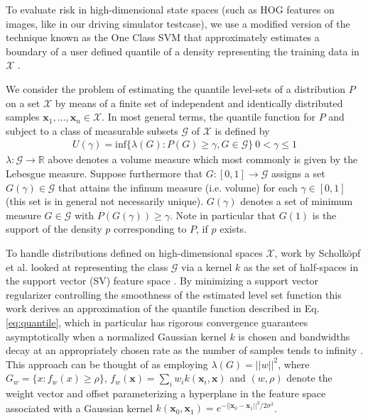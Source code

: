 \documentclass[10pt, conference]{ieeeconf}      %
\newcommand{\bx}{\mathbf{x}}
\newcommand{\fpnote}[1]{\ifthenelse{\boolean{include-notes}}%
 {\textcolor{blue}{\textbf{FP: #1}}}{}}
\begin{document}
To evaluate risk in high-dimensional state spaces (such as HOG features on images, like in our driving simulator testcase), we use
a modified version of the technique known as the One Class SVM that  approximately estimates a boundary of a user defined quantile of
a density representing the training data in $\mathcal{X}$ \cite{scholkopf2001estimating}.


We consider the problem of estimating the quantile level-sets of a distribution $P$ on a set $\mathcal{X}$ by means of a finite set of
independent and identically distributed samples $\mathbf{x}_1,...,\mathbf{x}_n\in \mathcal{X}$.
In most general terms, the quantile function for $P$ and subject to a class of measurable subsets $\mathcal{G}$ of $\mathcal{X}$ is
defined by
\begin{align}\label{eq:quantile}
U(\gamma) = \mbox{inf} \lbrace \lambda(G):P(G) \geq \gamma, G \in \mathcal{G} \rbrace \: 0<\gamma \leq 1
\end{align} 
$\lambda:\mathcal{G}\to \mathbb{R}$ above denotes a volume measure which most commonly is given by the Lebesgue measure.
Suppose furthermore that $G:[0,1]\to \mathcal{G}$ assigns a set $G(\gamma) \in \mathcal{G}$ that attains the infinum
measure (i.e. volume) for each $\gamma\in [0,1]$ (this set is in general not necessarily unique). 
$G(\gamma)$ denotes a set of minimum measure $G \in \mathcal{G}$ with $P(G(\gamma))\ge \gamma$. Note in particular that $G(1)$ is the support of the density $p$ corresponding to $P$, if $p$ exists. 

To handle distributions defined on high-dimensional spaces $\mathcal{X}$, work by Scholk{\"o}pf et al. looked at representing the class $\mathcal{G}$ via a kernel $k$ as the set of half-spaces in the support vector (SV) feature space \cite{scholkopf2001estimating}. 
By minimizing a support vector regularizer controlling the smoothness of the estimated level set function this work
derives an approximation of the quantile function described in Eq. \ref{eq:quantile}, which in particular has rigorous
convergence guarantees asymptotically when a normalized Gaussian kernel $k$ is chosen and bandwidths decay at an
appropriately chosen rate as the number of samples tends to infinity \cite{vert2006consistency}.
This approach can be thought of as employing $\lambda(G) = ||w||^2$, where $G_w = \lbrace x: f_w(x) \geq \rho \rbrace$,
$f_w(\mathbf{x}) = \sum_i w_i k(\mathbf{x}_i, \mathbf{x})$
and $(w,\rho)$ denote the weight vector and offset parameterizing a hyperplane in the feature space associated with a
Gaussian kernel $k(\bx_0,\bx_1) = e^{-||\bx_0 - \bx_1||^2/2\sigma^2}$.
\end{document}
